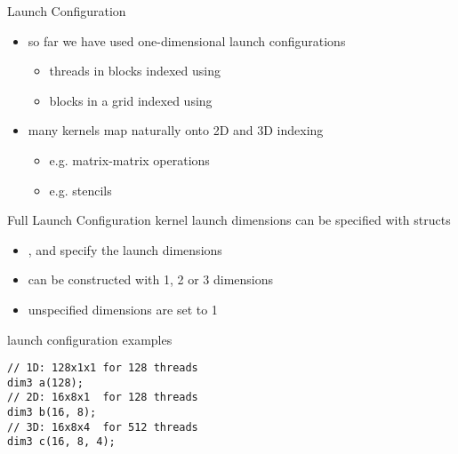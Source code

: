 
\begin{frame}[fragile]{}
   \begin{info}{Launch Configuration}
       \begin{itemize}
           \item so far we have used one-dimensional launch configurations
           \begin{itemize}
               \item threads in blocks indexed using 
               \item blocks in a grid indexed using 
           \end{itemize}
           \item many kernels map naturally onto 2D and 3D indexing
           \begin{itemize}
               \item e.g. matrix-matrix operations
               \item e.g. stencils
           \end{itemize}
       \end{itemize}
   \end{info}

\end{frame}

\begin{frame}[fragile]{}
   \begin{info}{Full Launch Configuration}
        kernel launch dimensions can be specified with  structs
        \begin{center}
        \end{center}
       \begin{itemize}
           \item {},  and  specify the launch dimensions
           \item can be constructed with 1, 2 or 3 dimensions
           \item unspecified  dimensions are set to 1
       \end{itemize}
   \end{info}
   \begin{code}{launch configuration examples}
        \begin{lstlisting}[style=boxcudatiny]
// 1D: 128x1x1 for 128 threads
dim3 a(128);
// 2D: 16x8x1  for 128 threads
dim3 b(16, 8);
// 3D: 16x8x4  for 512 threads
dim3 c(16, 8, 4);
        \end{lstlisting}
   \end{code}

\end{frame}


